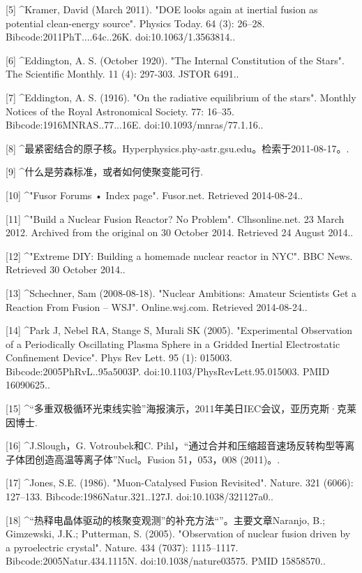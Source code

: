 [5]
^Kramer, David (March 2011). "DOE looks again at inertial fusion as potential clean-energy source". Physics Today. 64 (3): 26–28. Bibcode:2011PhT....64c..26K. doi:10.1063/1.3563814..

[6]
^Eddington, A. S. (October 1920). "The Internal Constitution of the Stars". The Scientific Monthly. 11 (4): 297-303. JSTOR 6491..

[7]
^Eddington, A. S. (1916). "On the radiative equilibrium of the stars". Monthly Notices of the Royal Astronomical Society. 77: 16–35. Bibcode:1916MNRAS..77...16E. doi:10.1093/mnras/77.1.16..

[8]
^最紧密结合的原子核。Hyperphysics.phy-astr.gsu.edu。检索于2011-08-17。.

[9]
^什么是劳森标准，或者如何使聚变能可行.

[10]
^"Fusor Forums • Index page". Fusor.net. Retrieved 2014-08-24..

[11]
^"Build a Nuclear Fusion Reactor? No Problem". Clhsonline.net. 23 March 2012. Archived from the original on 30 October 2014. Retrieved 24 August 2014..

[12]
^"Extreme DIY: Building a homemade nuclear reactor in NYC". BBC News. Retrieved 30 October 2014..

[13]
^Schechner, Sam (2008-08-18). "Nuclear Ambitions: Amateur Scientists Get a Reaction From Fusion – WSJ". Online.wsj.com. Retrieved 2014-08-24..

[14]
^Park J, Nebel RA, Stange S, Murali SK (2005). "Experimental Observation of a Periodically Oscillating Plasma Sphere in a Gridded Inertial Electrostatic Confinement Device". Phys Rev Lett. 95 (1): 015003. Bibcode:2005PhRvL..95a5003P. doi:10.1103/PhysRevLett.95.015003. PMID 16090625..

[15]
^“多重双极循环光束线实验”海报演示，2011年美日IEC会议，亚历克斯·克莱因博士.

[16]
^J.Slough，G. Votroubek和C. Pihl，“通过合并和压缩超音速场反转构型等离子体团创造高温等离子体”Nucl。Fusion 51，053，008 (2011)。.

[17]
^Jones, S.E. (1986). "Muon-Catalysed Fusion Revisited". Nature. 321 (6066): 127–133. Bibcode:1986Natur.321..127J. doi:10.1038/321127a0..

[18]
^“热释电晶体驱动的核聚变观测”的补充方法“”。主要文章Naranjo, B.; Gimzewski, J.K.; Putterman, S. (2005). "Observation of nuclear fusion driven by a pyroelectric crystal". Nature. 434 (7037): 1115–1117. Bibcode:2005Natur.434.1115N. doi:10.1038/nature03575. PMID 15858570..

